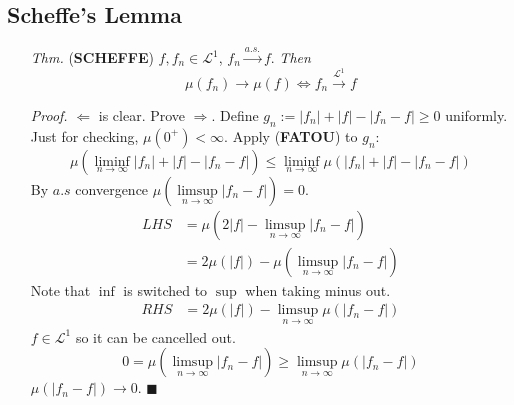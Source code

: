 \documentclass[a4paper,12pt,twoside]{book}
\begin{document}
\subsection{Scheffe's Lemma}
\begin{itemize}
	\item[\textit{Thm.}] (\textbf{SCHEFFE}) $f,f_n \in \mathcal{L}^1$, $f_n \xrightarrow{a.s.} f$. \textit{Then}
	\begin{equation}
		\mu(f_n)\to \mu(f) \iff f_n \xrightarrow{\mathcal{L}^1} f
	\end{equation}

	\item[\textit{Proof.}] $\Leftarrow$ is clear. Prove $\Rightarrow$. \newline
	Define $g_n:=|f_n|+|f|-|f_n-f|\geq 0$ uniformly. Just for checking, $\mu(0^+)<\infty$. Apply (\textbf{FATOU}) to $g_n$:
	\begin{equation}
		\mu(\liminf\limits_{n\rightarrow\infty}|f_n|+|f|-|f_n-f|) \leq \liminf\limits_{n\rightarrow\infty}\mu(|f_n|+|f|-|f_n-f|)
	\end{equation}
	By $a.s$ convergence $\mu(\limsup\limits_{n\rightarrow\infty}|f_n-f|)=0$.
	\begin{equation}
		\begin{split}
			LHS &= \mu(2|f|-\limsup\limits_{n\rightarrow\infty}|f_n-f|)\\
			&= 2\mu(|f|)-\mu(\limsup\limits_{n\rightarrow\infty}|f_n-f|) 
		\end{split}
	\end{equation}
	Note that $\inf$ is switched to $\sup$ when taking minus out.
	\begin{equation}
		\begin{split}
			RHS &= 2\mu(|f|)-\limsup\limits_{n\rightarrow\infty}\mu(|f_n-f|)
		\end{split}
	\end{equation}
	$f\in \mathcal{L}^1$ so it can be cancelled out. 
	\begin{equation}
		0=\mu(\limsup\limits_{n\rightarrow\infty}|f_n-f|)\geq \limsup\limits_{n\rightarrow\infty}\mu(|f_n-f|)
	\end{equation}
	$\mu(|f_n-f|)\to 0$. $\blacksquare$
\end{itemize}

\end{document}
